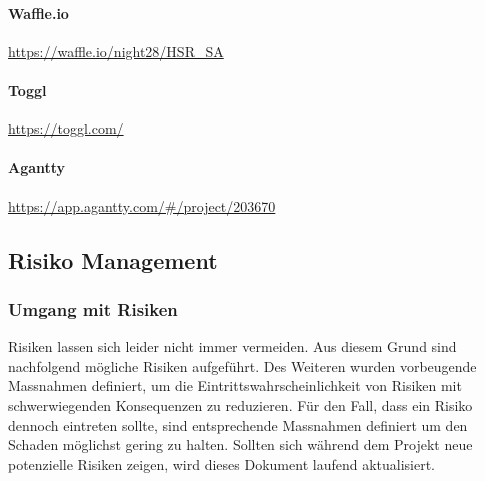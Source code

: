 \paragraph{Waffle.io} \href{https://waffle.io/night28/HSR\_SA}{https://waffle.io/night28/HSR\_SA}

\paragraph{Toggl} \href{https://toggl.com/}{https://toggl.com/}

\paragraph{Agantty} \href{https://app.agantty.com/\#/project/203670}{https://app.agantty.com/\#/project/203670}
 
\subsection{Risiko Management}

\subsubsection{Umgang mit Risiken}

Risiken lassen sich leider nicht immer vermeiden. Aus diesem Grund sind nachfolgend mögliche Risiken aufgeführt. Des Weiteren wurden vorbeugende Massnahmen definiert, um die Eintrittswahrscheinlichkeit von Risiken mit schwerwiegenden Konsequenzen zu reduzieren. Für den Fall, dass ein Risiko dennoch eintreten sollte, sind entsprechende Massnahmen definiert um den Schaden möglichst gering zu halten.
Sollten sich während dem Projekt neue potenzielle Risiken zeigen, wird dieses Dokument laufend aktualisiert.

